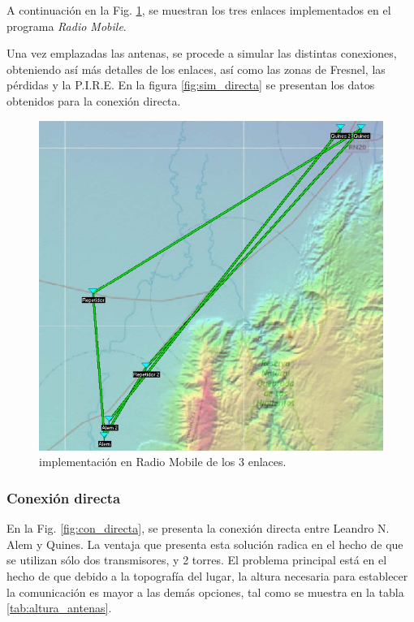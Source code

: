 \documentclass[11pt,a4paper]{article}
\begin{document}
A continuación en la Fig. \ref{fig:enlaces_radiom}, se muestran los tres enlaces implementados en el programa \textit{Radio Mobile}. 

Una vez emplazadas las antenas, se procede a simular las distintas conexiones, obteniendo así más detalles de los enlaces, así como las zonas de Fresnel, las pérdidas y la P.I.R.E. En la figura \ref{fig:sim_directa} se presentan los datos obtenidos para la conexión directa. 


\begin{figure}[htbp]
  \centering
  \includegraphics[width=\linewidth]{fotos_ema/imp_radio_mobile.jpg}
  \caption{implementación en Radio Mobile de los 3 enlaces.}
  \label{fig:enlaces_radiom}
\end{figure}
\clearpage
\subsubsection{Conexión directa}

En la Fig. \ref{fig:con_directa}, se presenta la conexión directa entre Leandro N. Alem y Quines.
La ventaja que presenta esta solución radica en el hecho de que se utilizan sólo dos transmisores, y 2 torres. El problema principal está en el hecho de que debido a la topografía del lugar, la altura necesaria para establecer la comunicación es mayor a las demás opciones, tal como se muestra en la tabla \ref{tab:altura_antenas}.
\end{document}
